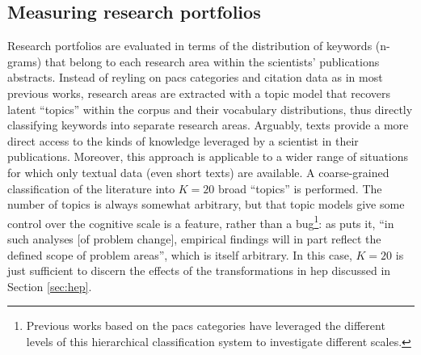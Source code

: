 \documentclass{article}
\begin{document}
\subsection{\label{sec:topics}Measuring research portfolios}

Research portfolios are evaluated in terms of the distribution of keywords (n-grams) that belong to each research area within the scientists' publications abstracts. Instead of reyling on \gls{pacs} categories and citation data as in most previous works, research areas are extracted with a topic model that recovers latent ``topics'' within the corpus and their vocabulary distributions, thus directly classifying keywords into separate research areas. Arguably, texts provide a more direct access to the kinds of knowledge leveraged by a scientist in their publications. Moreover, this approach is applicable to a wider range of situations for which only textual data (even short texts) are available. A coarse-grained classification of the literature into $K=20$ broad ``topics'' is performed. The number of topics is always somewhat arbitrary, but that topic models give some control over the cognitive scale is a feature, rather than a bug\footnote{Previous works based on the \gls{pacs} categories have leveraged the different levels of this hierarchical classification system to investigate different scales.}: as \citet{Gieryn1978} puts it, ``in such analyses [of problem change], empirical findings will in part reflect the defined scope of problem areas'', which is itself arbitrary. In this case, $K=20$ is just sufficient to discern the effects of the transformations in \gls{hep} discussed in Section \ref{sec:hep}.
\end{document}

